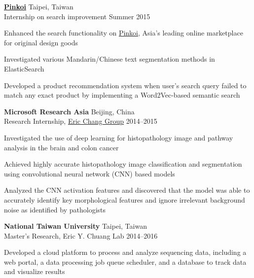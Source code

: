 \begin{entrylist}
\item \href{http://pinkoi.com}{\textbf{Pinkoi}} \hfill Taipei, Taiwan\\
Internship on search improvement \hfill
Summer 2015
\begin{detaillist}
    \item Enhanced the search functionality on \href{http://pinkoi.com}{Pinkoi}, Asia's leading online marketplace for original design goods
    \item Investigated various Mandarin/Chinese text segmentation methods in ElasticSearch
    \item Developed a product recommendation system when user's search query failed to match any exact product by implementing a Word2Vec-based semantic search
\end{detaillist}

\item \textbf{Microsoft Research Asia} \hfill Beijing, China\\
Research Internship, \href{https://www.microsoft.com/en-us/research/people/echang/}{Eric Chang Group} \hfill
2014--2015
\begin{detaillist}
    \item Investigated the use of deep learning for histopathology image and pathway analysis in the brain and colon cancer
    \item Achieved highly accurate histopathology image classification and segmentation using convolutional neural network (CNN) based models
    \item Analyzed the CNN activation features and discovered that the model was able to
    accurately identify key morphological features and ignore irrelevant background noise as identified by pathologists
\end{detaillist}

\item \textbf{National Taiwan University} \hfill Taipei, Taiwan\\
Master's Research, Eric Y. Chuang Lab \hfill
2014--2016
\begin{detaillist}
    \item Developed a cloud platform to process and analyze sequencing data, including a web portal, a data processing job queue scheduler, and a database to track data and visualize results
\end{detaillist}


\end{entrylist}
